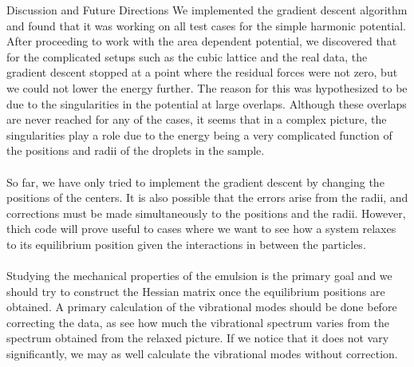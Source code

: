 \documentclass[12pt]{article}
\begin{document}
\begin{section}{Discussion and Future Directions}
We implemented the gradient descent algorithm and found that it was working on all test cases for the simple harmonic potential. After proceeding to work with the area dependent potential, we discovered that for the complicated setups such as the cubic lattice and the real data, the gradient descent stopped at a point where the residual forces were not zero, but we could not lower the energy further. The reason for this was hypothesized to be due to the singularities in the potential at large overlaps. Although these overlaps are never reached for any of the cases, it seems that in a complex picture, the singularities play a role due to the energy being a very complicated function of the positions and radii of the droplets in the sample. \\\\
So far, we have only tried to implement the gradient descent by changing the positions of the centers. It is also possible that the errors arise from the radii, and corrections must be made simultaneously to the positions and the radii. However, thich code will prove useful to cases where we want to see how a system relaxes to its equilibrium position given the interactions in between the particles.\\\\
Studying the mechanical properties of the emulsion is the primary goal and we should try to construct the Hessian matrix once the equilibrium positions are obtained. A primary calculation of the vibrational modes should be done before correcting the data, as see how much the vibrational spectrum varies from the spectrum obtained from the relaxed picture. If we notice that it does not vary significantly, we may as well calculate the vibrational modes without correction. 

\end{section}



\end{document}
